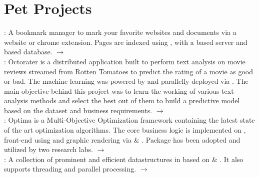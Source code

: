 \documentclass[]{bigfatnoob-resume}
\begin{document}

\section{Pet Projects}
\href{http://Region.io}{}: A bookmark manager to mark your favorite websites and documents via a website or chrome extension. Pages are indexed using , with a  based server and  based database. $\rightarrow$ \href{http://region.io}{}\\ \vspace{1.5mm}
\href{https://github.com/NCSU-Advanced-Algos/octorater}{}: Octorater is a distributed application built to perform text analysis on movie reviews streamed from Rotten Tomatoes to predict the rating of a movie as good or bad. The machine learning was powered by  and parallelly deployed via . The main objective behind this project was to learn the working of various text analysis methods and select the best out of them to build a predictive model based on the dataset and business requirements. $\rightarrow$ \href{https://github.com/NCSU-Advanced-Algos/octorater}{}\\ \vspace{1.5mm}
\href{https://github.com/bigfatnoob/optima}{}: Optima is a Multi-Objective Optimization framework containing the latest state of the art optimization algorithms. The core business logic is implemented on , front-end using  and graphic rendering via  \& . Package has been adopted and utilized by two research labs. $\rightarrow$  \href{https://github.com/bigfatnoob/optima}{}\\ \vspace{1.5mm}
\href{https://github.com/dr-bigfatnoob/collections}{}: A collection of prominent and efficient datastructures in  based on  \& . It also supports threading and parallel processing. $\rightarrow$\href{https://github.com/dr-bigfatnoob/collections}{}\\
\sectionsep
\sectionsep

\end{document}
